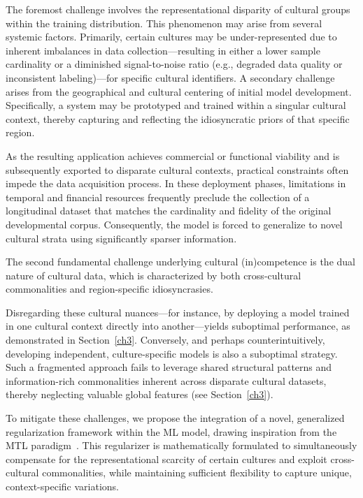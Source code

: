 The foremost challenge involves the representational disparity of cultural groups within the training distribution. 
This phenomenon may arise from several systemic factors. Primarily, certain cultures may be under-represented due to inherent imbalances in data collection—resulting in either a lower sample cardinality or a diminished signal-to-noise ratio (e.g., degraded data quality or inconsistent labeling)—for specific cultural identifiers.
A secondary challenge arises from the geographical and cultural centering of initial model development. 
Specifically, a system may be prototyped and trained within a singular cultural context, thereby capturing and reflecting the idiosyncratic priors of that specific region.

As the resulting application achieves commercial or functional viability and is subsequently exported to disparate cultural contexts, practical constraints often impede the data acquisition process. 
In these deployment phases, limitations in temporal and financial resources frequently preclude the collection of a longitudinal dataset that matches the cardinality and fidelity of the original developmental corpus. 
Consequently, the model is forced to generalize to novel cultural strata using significantly sparser information.

The second fundamental challenge underlying cultural (in)competence is the dual nature of cultural data, which is characterized by both cross-cultural commonalities and region-specific idiosyncrasies.

Disregarding these cultural nuances—for instance, by deploying a model trained in one cultural context directly into another—yields suboptimal performance, as demonstrated in Section~\ref{ch3}. 
Conversely, and perhaps counterintuitively, developing independent, culture-specific models is also a suboptimal strategy. 
Such a fragmented approach fails to leverage shared structural patterns and information-rich commonalities inherent across disparate cultural datasets, thereby neglecting valuable global features (see Section~\ref{ch3}).

To mitigate these challenges, we propose the integration of a novel, generalized regularization framework within the ML model, drawing inspiration from the MTL paradigm~\citep{zhang2018overview}. 
This regularizer is mathematically formulated to simultaneously compensate for the representational scarcity of certain cultures and exploit cross-cultural commonalities, while maintaining sufficient flexibility to capture unique, context-specific variations.

